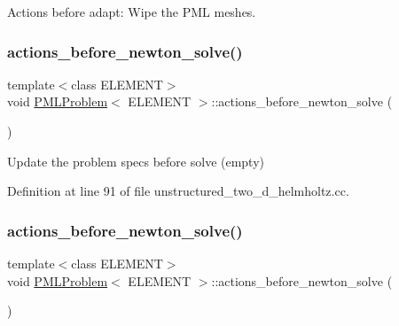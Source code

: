 Actions before adapt\+: Wipe the P\+ML meshes. 

\mbox{\label{classPMLProblem_a13feb001d09f64dcfe44bbe3c6fe3d97}} 
\subsubsection{\texorpdfstring{actions\+\_\+before\+\_\+newton\+\_\+solve()}{actions\_before\_newton\_solve()}\hspace{0.1cm}{\footnotesize\ttfamily [1/2]}}
{\footnotesize\ttfamily template$<$class E\+L\+E\+M\+E\+NT$>$ \\
void \hyperlink{classPMLProblem}{P\+M\+L\+Problem}$<$ E\+L\+E\+M\+E\+NT $>$\+::actions\+\_\+before\+\_\+newton\+\_\+solve (\begin{DoxyParamCaption}{ }\end{DoxyParamCaption})\hspace{0.3cm}{\ttfamily [inline]}}



Update the problem specs before solve (empty) 



Definition at line 91 of file unstructured\+\_\+two\+\_\+d\+\_\+helmholtz.\+cc.

\mbox{\label{classPMLProblem_a13feb001d09f64dcfe44bbe3c6fe3d97}} 
\subsubsection{\texorpdfstring{actions\+\_\+before\+\_\+newton\+\_\+solve()}{actions\_before\_newton\_solve()}\hspace{0.1cm}{\footnotesize\ttfamily [2/2]}}
{\footnotesize\ttfamily template$<$class E\+L\+E\+M\+E\+NT$>$ \\
void \hyperlink{classPMLProblem}{P\+M\+L\+Problem}$<$ E\+L\+E\+M\+E\+NT $>$\+::actions\+\_\+before\+\_\+newton\+\_\+solve (\begin{DoxyParamCaption}{ }\end{DoxyParamCaption})\hspace{0.3cm}{\ttfamily [inline]}}



